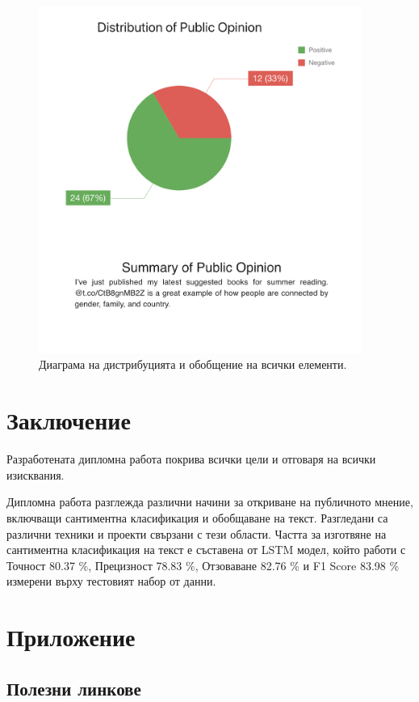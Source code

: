 \documentclass{article}
\begin{document}
\begin{figure}[H]
\centering
\captionsetup{justification=centering}
\includegraphics[width=400px, keepaspectratio]{chapter-07/diagrams.png}
\caption{Диаграма на дистрибуцията и обобщение на всички елементи.}
\end{figure}

\newpage\section{Заключение}

Разработената дипломна работа покрива всички цели и отговаря на всички изисквания.

Дипломна работа разглежда различни начини за откриване на публичното мнение, включващи сантиментна класификация и
обобщаване на текст. Разгледани са различни техники и проекти свързани с тези области. Частта за изготвяне на
сантиментна класификация на текст е съставена от LSTM модел, който работи с Точност 80.37 \%, Прецизност 78.83 \%,
Отзоваване 82.76 \% и F1 Score 83.98 \% измерени върху тестовият набор от данни.

\newpage\section{Приложение}

\subsection{Полезни линкове}
\end{document}
